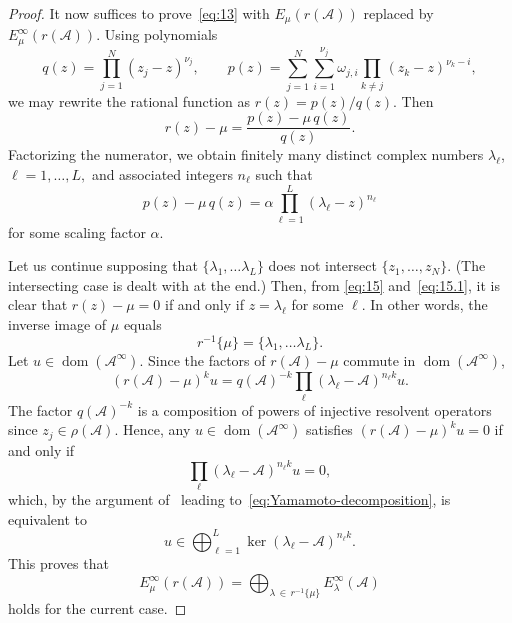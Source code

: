 \documentclass[12pt, oneside, reqno]{amsart}
\theoremstyle{remark}
\DeclareMathOperator{\dom}{dom}
\newcommand{\Ac}{\mathcal{A}}
\newcommand{\og}{\omega}
\begin{document}
\begin{proof}
  It now suffices to prove~\eqref{eq:13} with $E_\mu(r(\Ac))$ replaced
  by $E_\mu^\infty(r(\Ac))$. Using polynomials 
  \[
    q(z) = \prod_{j=1}^N (z_j - z)^{\nu_j}, \qquad
    p(z) = \sum_{j=1}^N \sum_{i=1}^{\nu_j}
    \og_{j,i} \prod_{k \ne j} (z_k - z)^{\nu_k - i},
  \]
  we may rewrite the rational function as $r(z) = p(z) / q(z)$. Then
  \begin{equation}
    \label{eq:15}
    r(z) - \mu = \frac{p(z) - \mu \,q(z)}{ q(z)}.
  \end{equation}
  Factorizing the numerator, we obtain finitely many distinct complex
  numbers $\lambda_\ell$, $\ell=1,\dots, L,$
  and associated integers $n_\ell$ such that
  \begin{equation}
    \label{eq:15.1}
    p(z) - \mu \,q(z) = 
    \alpha \prod_{\ell=1}^L    (\lambda_\ell - z)^{n_\ell}
\end{equation}
  for some scaling factor $\alpha$. 

  Let us continue supposing that $\{ \lambda_1, \dots \lambda_L\}$
  does not intersect $\{ z_1, \dots, z_N\}$.  (The intersecting case
  is dealt with at the end.) Then, from \eqref{eq:15} and~\eqref{eq:15.1},
  it is clear
  that $r(z) - \mu=0$ if and only if $z = \lambda_\ell$ for some
  $\ell$. In other words, the inverse image of $\mu$ equals 
  \[
    r^{-1}\{ \mu \} = \{ \lambda_1, \dots \lambda_L\}.
  \]
  Let $u \in \dom (\Ac^\infty)$.  Since the factors of $r(\Ac) - \mu$
  commute in $\dom (\Ac^\infty)$,
  \[
    (r(\Ac) - \mu)^k u = q (\Ac)^{-k} \prod_\ell (\lambda_\ell - \Ac)^{n_\ell k} u. 
  \]
  The factor $q (\Ac)^{-k}$ is a composition of powers of injective
  resolvent operators since $z_j \in \rho(\Ac)$. Hence, any
  $u \in \dom (\Ac^\infty)$ satisfies $(r(\Ac) - \mu)^k u =0$ if and
  only if
  \[
    \prod_\ell (\lambda_\ell - \Ac)^{n_\ell k} u = 0,
  \]
  which, by the argument of~\cite{Yam1971-1} leading
  to~\eqref{eq:Yamamoto-decomposition}, is equivalent to
  \[
    u \in \bigoplus_{\ell =1}^L \ker( \lambda_\ell - \Ac)^{n_\ell k}.
  \]
  This proves that
  \begin{equation}
    \label{eq:16}
        E_\mu^\infty(r(\Ac)) =
    \bigoplus_{\lambda \,\in\, r^{-1} \{ \mu\} } E_\lambda^\infty (\Ac)      
  \end{equation}
  holds for the current case. 


\end{proof}
\end{document}
